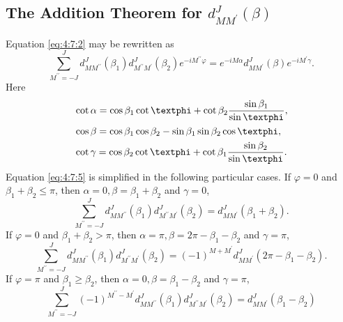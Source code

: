 \subsection{The Addition Theorem for $d_{M M^{\prime}}^{J}(\beta)$}\label{sec:4.7.2}
Equation \eqref{eq:4:7:2} may be rewritten as
\begin{equation}
\sum_{M^{\prime \prime}=-J}^{J} d_{M M^{\prime \prime}}^{J}\left(\beta_{1}\right) d_{M^{\prime \prime} M^{\prime}}^{J}\left(\beta_{2}\right) e^{-i M^{\prime \prime} \varphi}=e^{-i M \alpha} d_{M M^{\prime}}^{J}(\beta) e^{-i M^{\prime} \gamma}. \label{eq:4:7:5}
\end{equation}
Here
\begin{align}
& \cot \alpha=\cos \beta_{1} \cot \varphi+\cot \beta_{2} \frac{\sin \beta_{1}}{\sin \varphi}  ,\notag\\
& \cos \beta=\cos \beta_{1} \cos \beta_{2}-\sin \beta_{1} \sin \beta_{2} \cos \varphi  ,\label{eq:4:7:6}\\
& \cot \gamma=\cos \beta_{2} \cot \varphi+\cot \beta_{1} \frac{\sin \beta_{2}}{\sin \varphi} .\notag
\end{align}
Equation \eqref{eq:4:7:5} is simplified in the following particular cases. If $\varphi=0$ and $\beta_{1}+\beta_{2} \leq \pi$, then $\alpha=0, \beta=\beta_{1}+\beta_{2}$ and $\gamma=0$,
\begin{equation}
\sum_{M^{\prime \prime}=-J}^{J} d_{M M^{\prime \prime}}^{J}\left(\beta_{1}\right) d_{M^{\prime \prime} M^{\prime}}^{J}\left(\beta_{2}\right)=d_{M M^{\prime}}^{J}\left(\beta_{1}+\beta_{2}\right). \label{eq:4:7:7}
\end{equation}
If $\varphi=0$ and $\beta_{1}+\beta_{2}>\pi$, then $\alpha=\pi, \beta=2 \pi-\beta_{1}-\beta_{2}$ and $\gamma=\pi$,
\begin{equation}
\sum_{M^{\prime \prime}=-J}^{J} d_{M M^{\prime \prime}}^{J}\left(\beta_{1}\right) d_{M^{\prime \prime} M^{\prime}}^{J}\left(\beta_{2}\right)=(-1)^{M+M^{\prime}} d_{M M^{\prime}}^{J}\left(2 \pi-\beta_{1}-\beta_{2}\right). \label{eq:4:7:8}
\end{equation}
If $\varphi=\pi$ and $\beta_{1} \geq \beta_{2}$, then $\alpha=0, \beta=\beta_{1}-\beta_{2}$ and $\gamma=\pi$,
\begin{equation}
\sum_{M^{\prime \prime}=-J}^{J}(-1)^{M^{\prime \prime}-M^{\prime}} d_{M M^{\prime \prime}}^{J}\left(\beta_{1}\right) d_{M^{\prime \prime} M^{\prime}}^{J}\left(\beta_{2}\right)=d_{M M^{\prime}}^{J}\left(\beta_{1}-\beta_{2}\right) \label{eq:4:7:9}
\end{equation}
